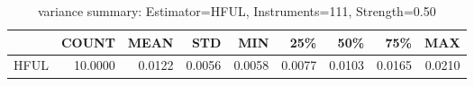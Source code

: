 \begin{table}[ht]
\centering
\caption{variance summary: Estimator=HFUL, Instruments=111, Strength=0.50}
\begin{tabular}{lrrrrrrrr}
\toprule
 & COUNT & MEAN & STD & MIN & 25\% & 50\% & 75\% & MAX \\
\midrule
HFUL & 10.0000 & 0.0122 & 0.0056 & 0.0058 & 0.0077 & 0.0103 & 0.0165 & 0.0210 \\
\bottomrule
\end{tabular}
\end{table}
